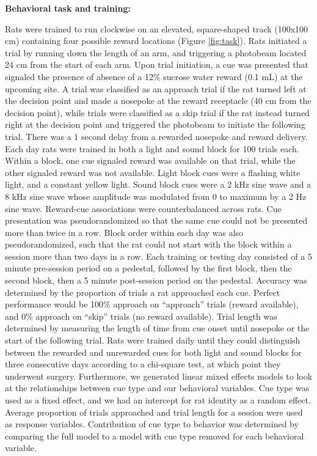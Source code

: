 \documentclass[11pt]{article}
\begin{document}
{\bf Behavioral task and training:} 

Rats were trained to run clockwise on an elevated, square-shaped track (100x100 cm) containing four possible reward locations (Figure \ref{fig:task}). Rats initiated a trial by running down the length of an arm, and triggering a photobeam located 24 cm from the start of each arm. Upon trial initiation, a cue was presented that signaled the presence of absence of a 12\% sucrose water reward (0.1 mL) at the upcoming site. A trial was classified as an approach trial if the rat turned left at the decision point and made a nosepoke at the reward receptacle (40 cm from the decision point), while trials were classified as a skip trial if the rat instead turned right at the decision point and triggered the photobeam to initiate the following trial. There was a 1 second delay from a rewarded nosepoke and reward delivery. Each day rats were trained in both a light and sound block for 100 trials each. Within a block, one cue signaled reward was available on that trial, while the other signaled reward was not available. Light block cues were a flashing white light, and a constant yellow light. Sound block cues were a 2 kHz sine wave and a 8 kHz sine wave whose amplitude was modulated from 0 to maximum by a 2 Hz sine wave. Reward-cue associations were counterbalanced across rats. Cue presentation was pseudorandomized so that the same cue could not be presented more than twice in a row. Block order within each day was also pseudorandomized, such that the rat could not start with the block within a session more than two days in a row. Each training or testing day consisted of a 5 minute pre-session period on a pedestal, followed by the first block, then the second block, then a 5 minute post-session period on the pedestal. Accuracy was determined by the proportion of trials a rat approached each cue. Perfect performance would be 100\% approach on “approach” trials (reward available), and 0\% approach on “skip” trials (no reward available). Trial length was determined by measuring the length of time from cue onset until nosepoke or the start of the following trial. Rats were trained daily until they could distinguish between the rewarded and unrewarded cues for both light and sound blocks for three consecutive days according to a chi-square test, at which point they underwent surgery. Furthermore, we generated linear mixed effects models to look at the relationships between cue type and our behavioral variables. Cue type was used as a fixed effect, and we had an intercept for rat identity as a random effect. Average proportion of trials approached and trial length for a session were used as response variables. Contribution of cue type to behavior was determined by comparing the full model to a model with cue type removed for each behavioral variable. 
\end{document}
